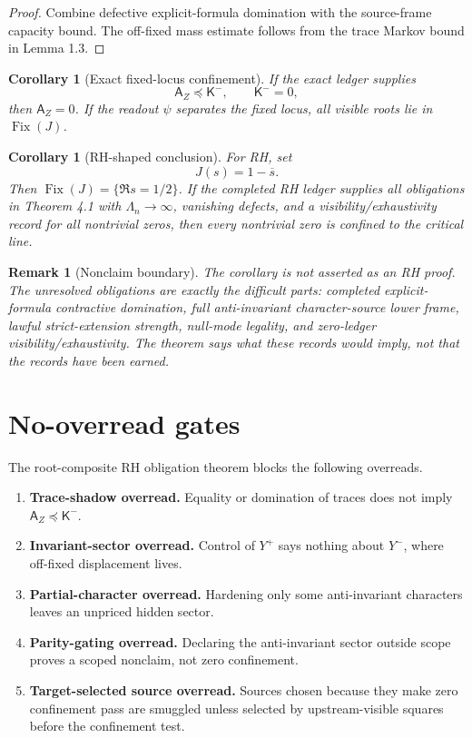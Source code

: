 \documentclass[11pt]{article}
\newtheorem{corollary}[theorem]{Corollary}
\newtheorem{remark}[theorem]{Remark}
\newcommand{\K}{\mathsf K}
\newcommand{\A}{\mathsf A}
\newcommand{\Fix}{\operatorname{Fix}}
\begin{document}
\begin{proof}
Combine defective explicit-formula domination with the source-frame capacity bound.  The off-fixed mass estimate follows from the trace Markov bound in Lemma 1.3.
\end{proof}

\begin{corollary}[Exact fixed-locus confinement]
If the exact ledger supplies
\[
  \A_Z\preceq\K^-,
  \qquad
  \K^-=0,
\]
then \(\A_Z=0\).  If the readout \(\psi\) separates the fixed locus, all visible roots lie in \(\Fix(J)\).
\end{corollary}

\begin{corollary}[RH-shaped conclusion]
For RH, set
\[
  J(s)=1-\overline{s}.
\]
Then \(\Fix(J)=\{\Re s=1/2\}\).  If the completed RH ledger supplies all obligations in Theorem 4.1 with \(\Lambda_n\to\infty\), vanishing defects, and a visibility/exhaustivity record for all nontrivial zeros, then every nontrivial zero is confined to the critical line.
\end{corollary}

\begin{remark}[Nonclaim boundary]
The corollary is not asserted as an RH proof.  The unresolved obligations are exactly the difficult parts: completed explicit-formula contractive domination, full anti-invariant character-source lower frame, lawful strict-extension strength, null-mode legality, and zero-ledger visibility/exhaustivity.  The theorem says what these records would imply, not that the records have been earned.
\end{remark}

\section{No-overread gates}

The root-composite RH obligation theorem blocks the following overreads.

\begin{enumerate}[leftmargin=2em]
  \item \textbf{Trace-shadow overread.}  Equality or domination of traces does not imply \(\A_Z\preceq\K^-\).
  \item \textbf{Invariant-sector overread.}  Control of \(Y^+\) says nothing about \(Y^-\), where off-fixed displacement lives.
  \item \textbf{Partial-character overread.}  Hardening only some anti-invariant characters leaves an unpriced hidden sector.
  \item \textbf{Parity-gating overread.}  Declaring the anti-invariant sector outside scope proves a scoped nonclaim, not zero confinement.
  \item \textbf{Target-selected source overread.}  Sources chosen because they make zero confinement pass are smuggled unless selected by upstream-visible squares before the confinement test.
\end{enumerate}
\end{document}
